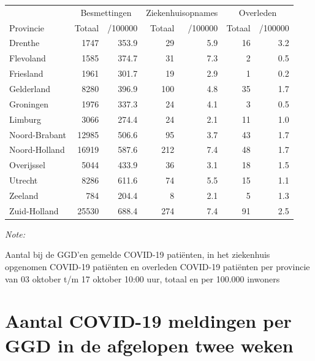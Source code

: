 \documentclass[
  english,
  man,floatsintext]{apa6}
\begin{document}
\begin{table}[H]
\centering
\begin{threeparttable}
\begin{tabular}{lrrrrrr}
\toprule
\multicolumn{1}{c}{ } & \multicolumn{2}{c}{Besmettingen} & \multicolumn{2}{c}{Ziekenhuisopnames} & \multicolumn{2}{c}{Overleden} \\
\cmidrule(l{3pt}r{3pt}){2-3} \cmidrule(l{3pt}r{3pt}){4-5} \cmidrule(l{3pt}r{3pt}){6-7}
Provincie & Totaal & /100000 & Totaal & /100000 & Totaal & /100000\\
\midrule
Drenthe & 1747 & 353.9 & 29 & 5.9 & 16 & 3.2\\
Flevoland & 1585 & 374.7 & 31 & 7.3 & 2 & 0.5\\
Friesland & 1961 & 301.7 & 19 & 2.9 & 1 & 0.2\\
Gelderland & 8280 & 396.9 & 100 & 4.8 & 35 & 1.7\\
Groningen & 1976 & 337.3 & 24 & 4.1 & 3 & 0.5\\
Limburg & 3066 & 274.4 & 24 & 2.1 & 11 & 1.0\\
Noord-Brabant & 12985 & 506.6 & 95 & 3.7 & 43 & 1.7\\
Noord-Holland & 16919 & 587.6 & 212 & 7.4 & 48 & 1.7\\
Overijssel & 5044 & 433.9 & 36 & 3.1 & 18 & 1.5\\
Utrecht & 8286 & 611.6 & 74 & 5.5 & 15 & 1.1\\
Zeeland & 784 & 204.4 & 8 & 2.1 & 5 & 1.3\\
Zuid-Holland & 25530 & 688.4 & 274 & 7.4 & 91 & 2.5\\
\bottomrule
\end{tabular}
\begin{tablenotes}
\item \textit{Note: } 
\item Aantal bij de GGD’en gemelde COVID-19 patiënten, in het ziekenhuis opgenomen COVID-19 patiënten en overleden COVID-19 patiënten per provincie van 03 oktober t/m 17 oktober 10:00 uur, totaal en per 100.000 inwoners
\end{tablenotes}
\end{threeparttable}
\end{table}

\newpage

\hypertarget{aantal-covid-19-meldingen-per-ggd-in-de-afgelopen-twee-weken}{%
\section{Aantal COVID-19 meldingen per GGD in de afgelopen twee weken}\label{aantal-covid-19-meldingen-per-ggd-in-de-afgelopen-twee-weken}}
\end{document}
